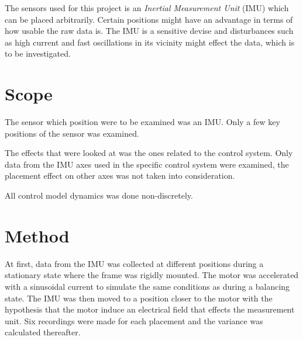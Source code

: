 \documentclass[a4paper,11pt]{kth-mag}
\begin{document}
The sensors used for this project is an \textit{Inertial Measurement Unit} (IMU) which can be placed arbitrarily. Certain positions might have an advantage in terms of how usable the raw data is. The IMU is a sensitive devise and disturbances such as high current and fast oscillations in its vicinity might effect the data, which is to be investigated. 

\section{Scope}
The sensor which position were to be examined was an IMU. Only a few key positions of the sensor was examined.

The effects that were looked at was the ones related to the control system. Only data from the IMU axes used in the specific control system were examined, the placement effect on other axes was not taken into consideration.

All control model dynamics was done non-discretely.

\section{Method} \label{sec: method}
At first, data from the IMU was collected at different positions during a stationary state where the frame was rigidly mounted. The motor was accelerated with a sinusoidal current to simulate the same conditions as during a balancing state. The IMU was then moved to a position closer to the motor with the hypothesis that the motor induce an electrical field that effects the measurement unit.
Six recordings were made for each placement and the variance was calculated thereafter.
\end{document}
